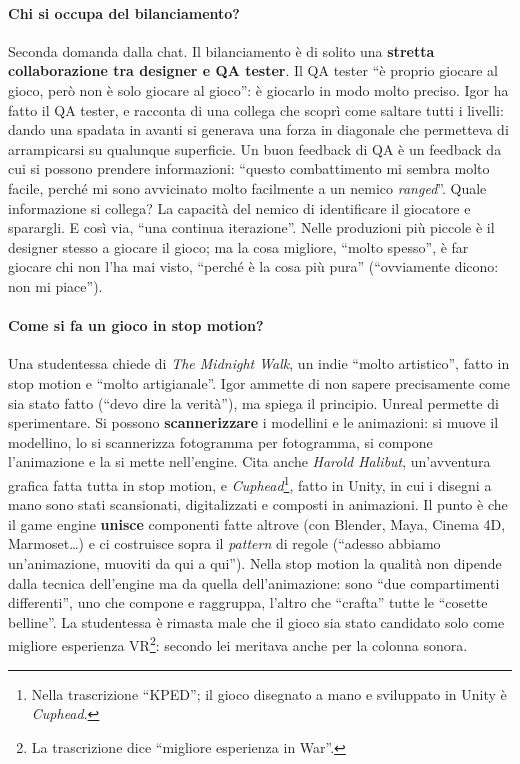 \paragraph{Chi si occupa del bilanciamento?} Seconda domanda dalla chat. Il bilanciamento
è di solito una \textbf{stretta collaborazione tra designer e QA tester}. Il QA tester
``è proprio giocare al gioco, però non è solo giocare al gioco'': è giocarlo in modo
molto preciso. Igor ha fatto il QA tester, e racconta di una collega che scoprì come
saltare tutti i livelli: dando una spadata in avanti si generava una forza in
diagonale che permetteva di arrampicarsi su qualunque superficie. Un buon feedback di
QA è un feedback da cui si possono prendere informazioni: ``questo combattimento mi
sembra molto facile, perché mi sono avvicinato molto facilmente a un nemico
\emph{ranged}''. Quale informazione si collega? La capacità del nemico di identificare il
giocatore e sparargli. E così via, ``una continua iterazione''. Nelle produzioni più
piccole è il designer stesso a giocare il gioco; ma la cosa migliore, ``molto spesso'',
è far giocare chi non l'ha mai visto, ``perché è la cosa più pura'' (``ovviamente
dicono: non mi piace'').

\paragraph{Come si fa un gioco in stop motion?} Una studentessa chiede di \emph{The
Midnight Walk}, un indie ``molto artistico'', fatto in stop motion e ``molto
artigianale''. Igor ammette di non sapere precisamente come sia stato fatto (``devo
dire la verità''), ma spiega il principio. Unreal permette di sperimentare. Si possono
\textbf{scannerizzare} i modellini e le animazioni: si muove il modellino, lo si
scannerizza fotogramma per fotogramma, si compone l'animazione e la si mette
nell'engine. Cita anche \emph{Harold Halibut}, un'avventura grafica fatta tutta in stop
motion, e \emph{Cuphead}\footnote{Nella trascrizione ``KPED''; il gioco disegnato a mano
e sviluppato in Unity è \emph{Cuphead}.}, fatto in Unity, in cui i disegni a mano sono
stati scansionati, digitalizzati e composti in animazioni. Il punto è che il game engine
\textbf{unisce} componenti fatte altrove (con Blender, Maya, Cinema 4D, Marmoset\ldots)
e ci costruisce sopra il \emph{pattern} di regole (``adesso abbiamo un'animazione,
muoviti da qui a qui''). Nella stop motion la qualità non dipende dalla tecnica
dell'engine ma da quella dell'animazione: sono ``due compartimenti differenti'', uno
che compone e raggruppa, l'altro che ``crafta'' tutte le ``cosette belline''. La
studentessa è rimasta male che il gioco sia stato candidato solo come migliore
esperienza VR\footnote{La trascrizione dice ``migliore esperienza in War''.}: secondo
lei meritava anche per la colonna sonora.

